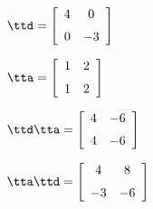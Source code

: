 {$\ttd = \left[ \begin {array}{cc} 4&0\\\noalign{\medskip}0&-3\end {array}
 \right]$
 
$\tta = \left[ \begin {array}{cc} 1&2\\\noalign{\medskip}1&2\end {array}
 \right] $}
{$\ttd\tta= \left[ \begin {array}{cc} 4&-6\\\noalign{\medskip}4&-6\end {array}
 \right] $

$\tta\ttd =  \left[ \begin {array}{cc} 4&8\\\noalign{\medskip}-3&-6\end {array}\right]$
}
  
